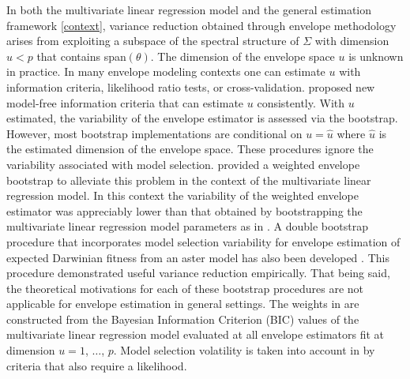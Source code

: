 \documentclass{article}\usepackage[]{graphicx}\usepackage[]{color}
\begin{document}
In both the multivariate linear regression model and the general estimation framework \eqref{context}, variance reduction obtained through envelope methodology arises from exploiting a subspace of the spectral structure of $\Sigma$ with dimension $u < p$ that contains span$(\theta)$. The dimension of the envelope space $u$ is unknown in practice. In many envelope modeling contexts one can estimate $u$ with information criteria, likelihood ratio tests, or cross-validation. %
\cite{zhangmai} proposed new model-free information criteria that can estimate $u$ consistently. With $u$ estimated, the variability of the envelope estimator is assessed via the bootstrap. However, most bootstrap implementations are conditional on $u = \hat{u}$ where $\hat{u}$ is the estimated dimension of the envelope space. These procedures ignore the variability associated with model selection. \cite{eck2017weighted} provided a weighted envelope bootstrap to alleviate this problem in the context of the multivariate linear regression model. In this context the variability of the weighted envelope estimator was appreciably lower than that obtained by bootstrapping the multivariate linear regression model parameters as in \citet{eck2018bootstrapping}. A double bootstrap procedure that incorporates model selection variability for envelope estimation of expected Darwinian fitness from an aster model \citep{geyer2007aster, shaw2008aster} has also been developed \citep{eck2020aster}. This procedure demonstrated useful variance reduction empirically. That being said, the theoretical motivations for each of these bootstrap procedures are not applicable for envelope estimation in general settings. The weights in \cite{eck2017weighted} are constructed from the Bayesian Information Criterion (\textsc{BIC}) values of the multivariate linear regression model evaluated at all envelope estimators fit at dimension $u = 1$, $\ldots$, $p$. Model selection volatility is taken into account in \citet{eck2020aster} by criteria that also require a likelihood. 

\end{document}
